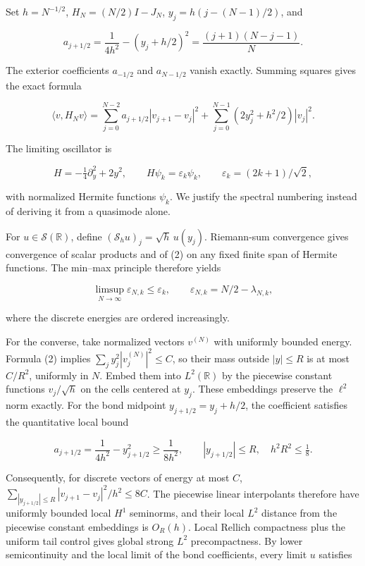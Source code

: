 \documentclass[
  10pt,
  a4paper,
]{article}
\begin{document}
Set \(h=N^{-1/2}\), \(H_N=(N/2)I-J_N\), \(y_j=h(j-(N-1)/2)\), and

\[
a_{j+1/2}=\frac1{4h^2}-(y_j+h/2)^2
=\frac{(j+1)(N-j-1)}N.
\]

The exterior coefficients \(a_{-1/2}\) and \(a_{N-1/2}\) vanish exactly. Summing squares gives the exact formula

\[
\boxed{\langle v,H_Nv\rangle
=\sum_{j=0}^{N-2}a_{j+1/2}|v_{j+1}-v_j|^2
+\sum_{j=0}^{N-1}(2y_j^2+h^2/2)|v_j|^2.}\tag{2}
\]

The limiting oscillator is

\[
H=-\tfrac14\partial_y^2+2y^2,\qquad
H\psi_k=\varepsilon_k\psi_k,\qquad
\varepsilon_k=(2k+1)/\sqrt2,
\tag{3}
\]

with normalized Hermite functions \(\psi_k\). We justify the spectral numbering instead of deriving it from a quasimode alone.

For \(u\in\mathcal S(\mathbb R)\), define \((\mathcal S_hu)_j=\sqrt h\,u(y_j)\). Riemann-sum convergence gives convergence of scalar products and of (2) on any fixed finite span of Hermite functions. The min--max principle therefore yields

\[
\limsup_{N\to\infty}\varepsilon_{N,k}\le\varepsilon_k,
\qquad\varepsilon_{N,k}=N/2-\lambda_{N,k},
\]

where the discrete energies are ordered increasingly.

For the converse, take normalized vectors \(v^{(N)}\) with uniformly bounded energy. Formula (2) implies \(\sum_j y_j^2 |v^{(N)}_j|^2\le C\), so their mass outside \(|y|\le R\) is at most \(C/R^2\), uniformly in \(N\). Embed them into \(L^2(\mathbb R)\) by the piecewise constant functions \(v_j/\sqrt h\) on the cells centered at \(y_j\). These embeddings preserve the \(\ell^2\) norm exactly. For the bond midpoint \(y_{j+1/2}=y_j+h/2\), the coefficient satisfies the quantitative local bound

\[
a_{j+1/2}=\frac1{4h^2}-y_{j+1/2}^2\ge\frac1{8h^2},
\qquad |y_{j+1/2}|\le R,\quad h^2R^2\le\tfrac18.
\]

Consequently, for discrete vectors of energy at most \(C\), \(\sum_{|y_{j+1/2}|\le R}|v_{j+1}-v_j|^2/h^2\le8C\). The piecewise linear interpolants therefore have uniformly bounded local \(H^1\) seminorms, and their local \(L^2\) distance from the piecewise constant embeddings is \(O_R(h)\). Local Rellich compactness plus the uniform tail control gives global strong \(L^2\) precompactness. By lower semicontinuity and the local limit of the bond coefficients, every limit \(u\) satisfies
\end{document}
